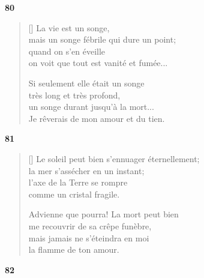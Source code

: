 \begin{center}
  \textbf{80}
\end{center}

\settowidth{\versewidth}{un songe qui durerait jusqu'à la mort...!}

\begin{verse}[\versewidth]
  La vie est un songe, \\
  mais un songe fébrile qui dure un point; \\
  quand on s'en éveille \\
  on voit que tout est vanité et fumée...

  Si seulement elle était un songe \\
  très long et très profond, \\
  un songe durant jusqu'à la mort... \\
  Je rêverais de mon amour et du tien.
\end{verse}

\bigskip

\begin{center}
  \textbf{81}
\end{center}

\settowidth{\versewidth}{Le soleil peut bien s'ennuager éternellement;}


\begin{verse}[\versewidth]
  Le soleil peut bien s'ennuager éternellement; \\
  la mer s'assécher en un instant; \\
  l'axe de la Terre se rompre \\
  comme un cristal fragile.

  Advienne que pourra! La mort peut bien \\
  me recouvrir de sa crêpe funèbre, \\
  mais jamais ne s'éteindra en moi \\
  la flamme de ton amour.
\end{verse}

\bigskip

\begin{center}
  \textbf{82}
\end{center}

\settowidth{\versewidth}{et la couleur des roses est ta couleur.}

